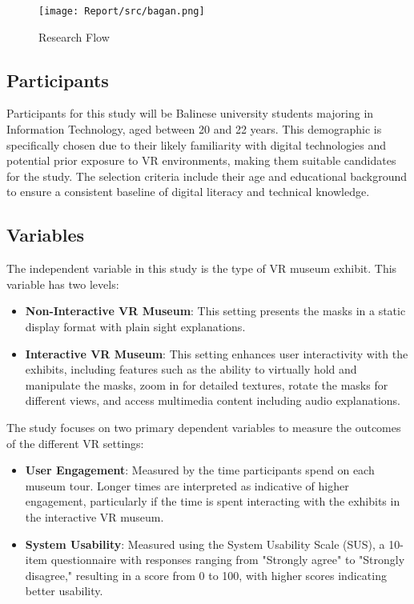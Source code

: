 \documentclass[conference]{IEEEtran}
\begin{document}
\begin{figure}[htbp]
    \centering
    \texttt{[image: Report/src/bagan.png]}
    \caption{Research Flow}
    \label{fig:researchflowchart}
\end{figure}



\subsection{Participants}
Participants for this study will be Balinese university students majoring in Information Technology, aged between 20 and 22 years. This demographic is specifically chosen due to their likely familiarity with digital technologies and potential prior exposure to VR environments, making them suitable candidates for the study. The selection criteria include their age and educational background to ensure a consistent baseline of digital literacy and technical knowledge.

\subsection{Variables}
The independent variable in this study is the type of VR museum exhibit. This variable has two levels:

\begin{itemize}
    \item \textbf{Non-Interactive VR Museum}: This setting presents the masks in a static display format with plain sight explanations.
    \item \textbf{Interactive VR Museum}: This setting enhances user interactivity with the exhibits, including features such as the ability to virtually hold and manipulate the masks, zoom in for detailed textures, rotate the masks for different views, and access multimedia content including audio explanations.
\end{itemize}

The study focuses on two primary dependent variables to measure the outcomes of the different VR settings:

\begin{itemize}
    \item \textbf{User Engagement}: Measured by the time participants spend on each museum tour. Longer times are interpreted as indicative of higher engagement, particularly if the time is spent interacting with the exhibits in the interactive VR museum.
    \item \textbf{System Usability}: Measured using the System Usability Scale (SUS), a 10-item questionnaire with responses ranging from "Strongly agree" to "Strongly disagree," resulting in a score from 0 to 100, with higher scores indicating better usability.
\end{itemize}
\end{document}
